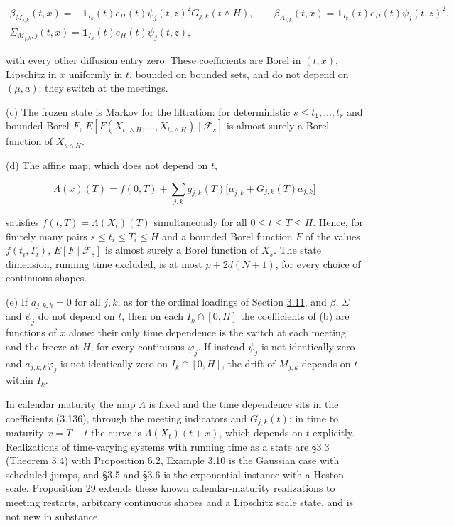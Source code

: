 \documentclass[11pt]{article}
\begin{document}
\begin{equation*}
\begin{gathered}
\beta_{M_{j,k}}(t,x)=-\mathbf 1_{I_k}(t)e_H(t)\psi_j(t,z)^2G_{j,k}(t\wedge H),\qquad \beta_{A_{j,k}}(t,x)=\mathbf 1_{I_k}(t)e_H(t)\psi_j(t,z)^2, \\
\Sigma_{M_{j,k},j}(t,x)=\mathbf 1_{I_k}(t)e_H(t)\psi_j(t,z),
\end{gathered} \tag{3.136}\label{eq:3.136}
\end{equation*}

with every other diffusion entry zero. These coefficients are Borel in \((t,x)\), Lipschitz in \(x\) uniformly in \(t\), bounded on bounded sets, and do not depend on \((\mu,a)\); they switch at the meetings.

(c) The frozen state is Markov for the filtration: for deterministic \(s\le t_1,\dots,t_r\) and bounded Borel \(F\), \(E[F(X_{t_1\wedge H},\dots,X_{t_r\wedge H})\mid\mathcal F_s]\) is almost surely a Borel function of \(X_{s\wedge H}\).

(d) The affine map, which does not depend on \(t\),

\begin{equation*}
\Lambda(x)(T)=f(0,T)+\sum_{j,k}g_{j,k}(T)\bigl[\mu_{j,k}+G_{j,k}(T)a_{j,k}\bigr] \tag{3.137}\label{eq:3.137}
\end{equation*}

satisfies \(f(t,T)=\Lambda(X_t)(T)\) simultaneously for all \(0\le t\le T\le H\). Hence, for finitely many pairs \(s\le t_i\le T_i\le H\) and a bounded Borel function \(F\) of the values \(f(t_i,T_i)\), \(E[F\mid\mathcal F_s]\) is almost surely a Borel function of \(X_s\). The state dimension, running time excluded, is at most \(p+2d(N+1)\), for every choice of continuous shapes.

(e) If \(a_{j,k,k}=0\) for all \(j,k\), as for the ordinal loadings of Section \hyperref[sec:3.11]{3.11}, and \(\beta\), \(\Sigma\) and \(\psi_j\) do not depend on \(t\), then on each \(I_k\cap[0,H]\) the coefficients of (b) are functions of \(x\) alone: their only time dependence is the switch at each meeting and the freeze at \(H\), for every continuous \(\varphi_j\). If instead \(\psi_j\) is not identically zero and \(a_{j,k,k}\varphi_j\) is not identically zero on \(I_k\cap[0,H]\), the drift of \(M_{j,k}\) depends on \(t\) within \(I_k\).

In calendar maturity the map \(\Lambda\) is fixed and the time dependence sits in the coefficients (3.136), through the meeting indicators and \(G_{j,k}(t)\); in time to maturity \(x=T-t\) the curve is \(\Lambda(X_t)(t+x)\), which depends on \(t\) explicitly. Realizations of time-varying systems with running time as a state are \cite{bjork2001existence} §3.3 (Theorem 3.4) with Proposition 6.2, \cite{fontana2022term} Example 3.10 is the Gaussian case with scheduled jumps, and \cite{brace2024sofr} §3.5 and §3.6 is the exponential instance with a Heston scale. Proposition \hyperref[res:Proposition-29]{29} extends these known calendar-maturity realizations to meeting restarts, arbitrary continuous shapes and a Lipschitz scale state, and is not new in substance.
\end{document}
